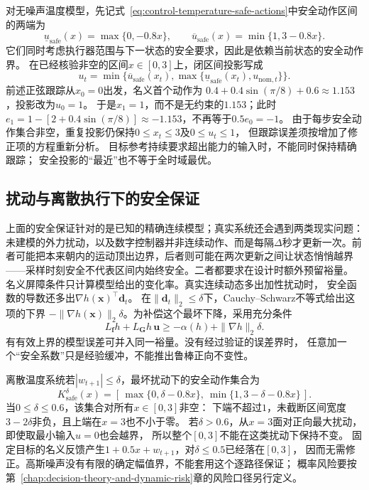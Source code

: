 对无噪声温度模型，先记式~\eqref{eq:control-temperature-safe-actions}中安全动作区间的两端为
\[
  \underline u_{\mathrm{safe}}(x)=\max\{0,-0.8x\},
  \qquad
  \overline u_{\mathrm{safe}}(x)=\min\{1,3-0.8x\}.
\]
它们同时考虑执行器范围与下一状态的安全要求，因此是依赖当前状态的安全动作界。
在已经核验非空的区间$x\in[0,3]$上，闭区间投影写成
\[
  u_t=\min\{\overline u_{\mathrm{safe}}(x_t),
       \max\{\underline u_{\mathrm{safe}}(x_t),u_{\mathrm{nom},t}\}\}.
\]
前述正弦跟踪从$x_0=0$出发，名义首个动作为
$0.4+0.4\sin(\pi/8)+0.6\approx1.153$，投影改为$u_0=1$。
于是$x_1=1$，而不是无约束的$1.153$；此时
$e_1=1-[2+0.4\sin(\pi/8)]\approx-1.153$，不再等于$0.5e_0=-1$。
由于每步安全动作集合非空，重复投影仍保持$0\leq x_t\leq3$及$0\leq u_t\leq1$，
但跟踪误差须按增加了修正项的方程重新分析。
目标参考持续要求超出能力的输入时，不能同时保持精确跟踪；
安全投影的“最近”也不等于全时域最优。

\subsection{扰动与离散执行下的安全保证}
上面的安全保证针对的是已知的精确连续模型；真实系统还会遇到两类现实问题：未建模的外力扰动，以及数字控制器并非连续动作、而是每隔\(\Delta\)秒才更新一次。前者可能把本来朝内的运动顶出边界，后者则可能在两次更新之间让状态悄悄越界——采样时刻安全不代表区间内始终安全。二者都要求在设计时额外预留裕量。
名义屏障条件只计算模型给出的变化率。真实连续动态多出加性扰动时，
安全函数的导数还多出$\nabla h(\bm x)^\top\bm d_t$。
在$\|\bm d_t\|_2\leq\delta$下，Cauchy--Schwarz不等式给出这项的下界
$-\|\nabla h(\bm x)\|_2\delta$。为补偿这个最坏下降，采用充分条件
\begin{equation}
  L_{\bm f}h+L_{\bm G}h\,\bm u
  \geq-\alpha(h)+\|\nabla h\|_2\delta.
  \label{eq:control-robust-cbf}
\end{equation}
有有效上界的模型误差可并入同一裕量。没有经过验证的误差界时，
任意加一个“安全系数”只是经验缓冲，不能推出鲁棒正向不变性。

离散温度系统若$|w_{t+1}|\leq\delta$，最坏扰动下的安全动作集合为
\begin{equation}
  K_{\mathrm{safe}}^\delta(x)
  =[\,\max\{0,\delta-0.8x\},\
       \min\{1,3-\delta-0.8x\}\,].
  \label{eq:control-temperature-robust-actions}
\end{equation}
当$0\leq\delta\leq0.6$，该集合对所有$x\in[0,3]$非空：
下端不超过$1$，未截断区间宽度$3-2\delta$非负，且上端在$x=3$也不小于零。
若$\delta>0.6$，从$x=3$面对正向最大扰动，即使取最小输入$u=0$也会越界，
所以整个$[0,3]$不能在这类扰动下保持不变。
固定目标的名义反馈产生$1+0.5x+w_{t+1}$，对$\delta\leq0.5$已经落在$[0,3]$，
因而无需修正。高斯噪声没有有限的确定幅值界，不能套用这个逐路径保证；
概率风险要按第~\ref{chap:decision-theory-and-dynamic-risk}章的风险口径另行定义。

